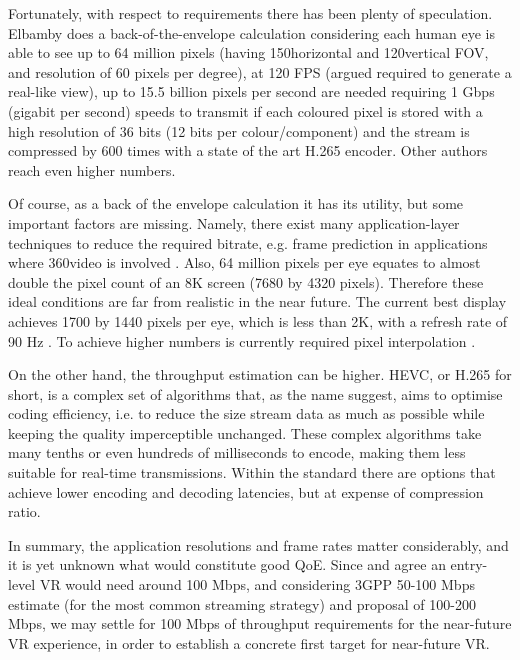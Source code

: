 Fortunately, with respect to requirements there has been plenty of speculation. Elbamby  \cite{Elbamby_towards_low_latency_vr} does a back-of-the-envelope calculation considering each human eye is able to  see up to 64 million pixels (having 150\tdeg horizontal and 120\tdeg vertical \ac{FOV}, and resolution of 60 pixels per degree), at 120 \ac{FPS} (argued required to generate a real-like view), up to 15.5 billion pixels per second are needed requiring 1 Gbps (gigabit per second) speeds to transmit if each coloured pixel is stored with a high resolution of 36 bits (12 bits per colour/component) and the stream is compressed by 600 times with a state of the art H.265 encoder. Other authors \cite{bastug_towards_interconnected_vr} reach even higher numbers.

Of course, as a back of the envelope calculation it has its utility, but some important factors are missing. Namely, there exist many application-layer techniques to reduce the required bitrate, e.g. frame prediction in applications where 360\tdeg video is involved \cite{frame_prediction}. Also, 64 million pixels per eye equates to almost double the pixel count of an 8K screen (7680 by 4320 pixels). Therefore these ideal conditions are far from realistic in the near future. The current best display achieves 1700 by 1440 pixels per eye, which is less than 2K, with a refresh rate of 90 Hz \cite{vive_cosmos_elite}. To achieve higher numbers is currently required  pixel interpolation \cite{pimax}.

On the other hand, the throughput estimation can be higher. \ac{HEVC}, or H.265 for short, is a complex set of algorithms that, as the name suggest, aims to optimise coding efficiency, i.e. to reduce the size stream data as much as possible while keeping the quality imperceptible unchanged. These complex algorithms take many tenths or even hundreds of milliseconds to encode, making them less suitable for real-time transmissions. Within the standard there are options that achieve lower encoding and decoding latencies, but at expense of compression ratio.

In summary, the application resolutions and frame rates matter considerably, and it is yet unknown what would constitute good \ac{QoE}. Since \cite{Elbamby_towards_low_latency_vr} and \cite{vr_on_the_edge} agree an entry-level VR would need around 100 Mbps, and considering \ac{3GPP} \cite{3GPP_xr} 50-100 Mbps estimate (for the most common streaming strategy) and \cite{bastug_towards_interconnected_vr} proposal of 100-200 Mbps, we may settle for 100 Mbps of throughput requirements for the near-future VR experience, in order to establish a concrete first target for near-future VR.

